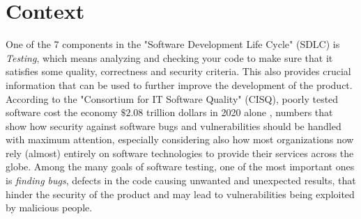 \newpage
\section{Context}
One of the 7 components in the "Software Development Life Cycle" (SDLC) is \textit{Testing}, which means analyzing and checking your code to make sure that it satisfies some quality, correctness and security criteria. This also provides crucial information that can be used to further improve the development of the product.
\newline
According to the "Consortium for IT Software Quality" (CISQ), poorly tested software cost the economy $\$2.08$ trillion dollars in 2020 alone \cite{forbes}, numbers that show how security against software bugs and vulnerabilities should be handled with maximum attention, especially considering also how most organizations now rely (almost) entirely on software technologies to provide their services across the globe.
\newline
Among the many goals of software testing, one of the most important ones is \textit{finding bugs}, defects in the code causing unwanted and unexpected results, that hinder the security of the product and may lead to vulnerabilities being exploited by malicious people.
\newline



